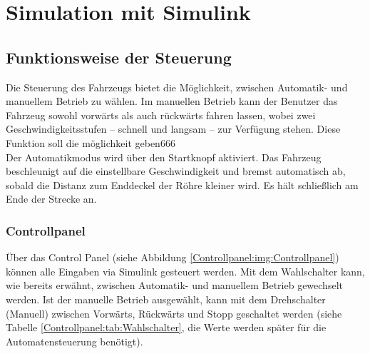 
\newpage
\section{Simulation mit Simulink}
\label{section:Simulation}



\subsection{Funktionsweise der Steuerung}
\label{Steuerung}


Die Steuerung des Fahrzeugs bietet die Möglichkeit, zwischen Automatik- und manuellem Betrieb zu wählen. Im manuellen Betrieb kann der Benutzer das Fahrzeug sowohl vorwärts als auch rückwärts fahren lassen, wobei zwei Geschwindigkeitsstufen – schnell und langsam – zur Verfügung stehen. Diese Funktion soll die möglichkeit geben666\\
Der Automatikmodus wird über den Startknopf aktiviert. Das Fahrzeug beschleunigt auf die einstellbare Geschwindigkeit und bremst automatisch ab, sobald die Distanz zum Enddeckel der Röhre kleiner wird. Es hält schließlich am Ende der Strecke an.\\

\subsubsection{Controllpanel}
\label{Steuerung:Controllpanel}
Über das Control Panel (siehe Abbildung \ref{Controllpanel:img:Controllpanel}) können alle Eingaben via Simulink gesteuert werden. Mit dem Wahlschalter kann, wie bereits erwähnt, zwischen Automatik- und manuellem Betrieb gewechselt werden. Ist der manuelle Betrieb ausgewählt, kann mit dem Drehschalter (Manuell) zwischen Vorwärts, Rückwärts und Stopp geschaltet werden (siehe Tabelle \ref{Controllpanel:tab:Wahlschalter}, die Werte werden später für die Automatensteuerung benötigt).\\


